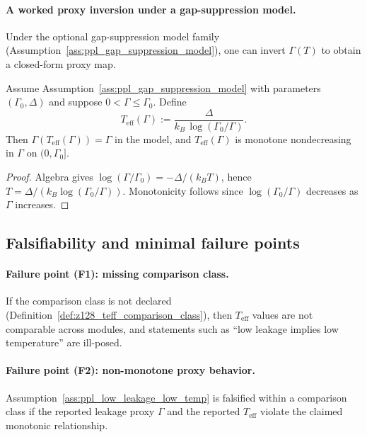 \paragraph{A worked proxy inversion under a gap-suppression model.}
\MatchTag Under the optional gap-suppression model family (Assumption~\ref{ass:ppl_gap_suppression_model}), one can invert $\Gamma(T)$ to obtain a closed-form proxy map.

\begin{proposition}\label{prop:z128_teff_gap_suppression_inversion}
\MatchTag Assume Assumption~\ref{ass:ppl_gap_suppression_model} with parameters $(\Gamma_0,\Delta)$ and suppose $0<\Gamma\le\Gamma_0$.
Define
\[
T_{\mathrm{eff}}(\Gamma):=\frac{\Delta}{k_B\,\log(\Gamma_0/\Gamma)}.
\]
Then $\Gamma(T_{\mathrm{eff}}(\Gamma))=\Gamma$ in the model, and $T_{\mathrm{eff}}(\Gamma)$ is monotone nondecreasing in $\Gamma$ on $(0,\Gamma_0]$.
\end{proposition}
\begin{proof}
Algebra gives $\log(\Gamma/\Gamma_0)=-\Delta/(k_B T)$, hence $T=\Delta/(k_B\log(\Gamma_0/\Gamma))$.
Monotonicity follows since $\log(\Gamma_0/\Gamma)$ decreases as $\Gamma$ increases.
\end{proof}

\subsection{Falsifiability and minimal failure points}
\label{subsec:teff_failure_points}

\paragraph{Failure point (F1): missing comparison class.}
\AuditTag If the comparison class is not declared (Definition~\ref{def:z128_teff_comparison_class}), then $T_{\mathrm{eff}}$ values are not comparable across modules, and statements such as ``low leakage implies low temperature'' are ill-posed.

\paragraph{Failure point (F2): non-monotone proxy behavior.}
\AuditTag Assumption~\ref{ass:ppl_low_leakage_low_temp} is falsified within a comparison class if the reported leakage proxy $\Gamma$ and the reported $T_{\mathrm{eff}}$ violate the claimed monotonic relationship.

